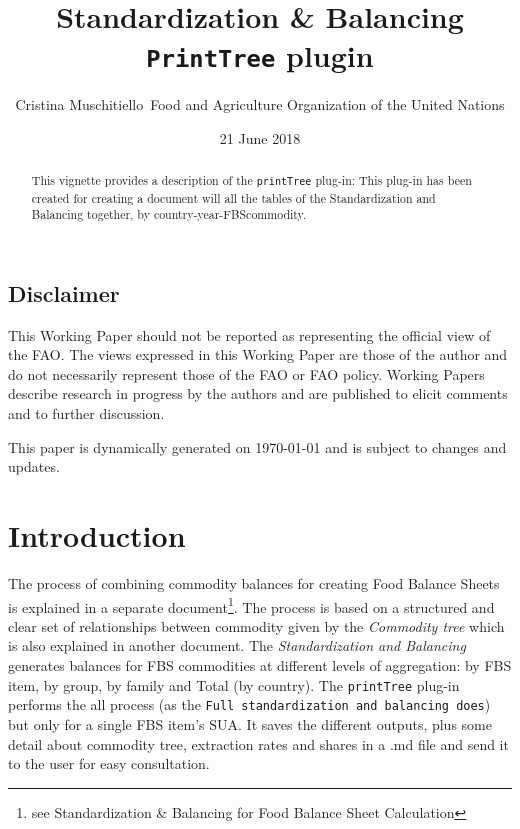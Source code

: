 \documentclass[]{article}
\title{Standardization \& Balancing\\
\texttt{PrintTree} plugin}
\author{Cristina Muschitiello~Food and Agriculture Organization of the United
Nations}
\date{21 June 2018}
\let\rmarkdownfootnote\footnote%
\def\footnote{\protect\rmarkdownfootnote}
\begin{document}
\maketitle
\begin{abstract}
This vignette provides a description of the \texttt{printTree} plug-in:
This plug-in has been created for creating a document will all the
tables of the Standardization and Balancing together, by
country-year-FBScommodity.
\end{abstract}

{
\setcounter{tocdepth}{4}
\tableofcontents
}
\newpage

\listoftables

\listoffigures

\subsection*{Disclaimer}\label{disclaimer}

This Working Paper should not be reported as representing the official
view of the FAO. The views expressed in this Working Paper are those of
the author and do not necessarily represent those of the FAO or FAO
policy. Working Papers describe research in progress by the authors and
are published to elicit comments and to further discussion.

This paper is dynamically generated on \today{} and is subject to
changes and updates.

\newpage

\section{Introduction}\label{introduction}

The process of combining commodity balances for creating Food Balance
Sheets is explained in a separate document\footnote{see Standardization
  \& Balancing for Food Balance Sheet Calculation}. The process is based
on a structured and clear set of relationships between commodity given
by the \emph{Commodity tree} which is also explained in another
document. The \emph{Standardization and Balancing} generates balances
for FBS commodities at different levels of aggregation: by FBS item, by
group, by family and Total (by country). The \texttt{printTree} plug-in
performs the all process (as the
\texttt{Full\ standardization\ and\ balancing\ does}) but only for a
single FBS item's SUA. It saves the different outputs, plus some detail
about commodity tree, extraction rates and shares in a .md file and send
it to the user for easy consultation.
\end{document}
